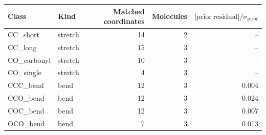 \begin{tabular}{llrrr}
\toprule
Class & Kind & Matched coordinates & Molecules & $|\mathrm{prior\ residual}|/\sigma_{\mathrm{prior}}$ \\
\midrule
CC\_short & stretch & 14 & 2 & -- \\
CC\_long & stretch & 15 & 3 & -- \\
CO\_carbonyl & stretch & 10 & 3 & -- \\
CO\_single & stretch & 4 & 3 & -- \\
CCC\_bend & bend & 12 & 3 & 0.004 \\
CCO\_bend & bend & 12 & 3 & 0.024 \\
COC\_bend & bend & 12 & 3 & 0.007 \\
OCO\_bend & bend & 7 & 3 & 0.013 \\
\bottomrule
\end{tabular}
